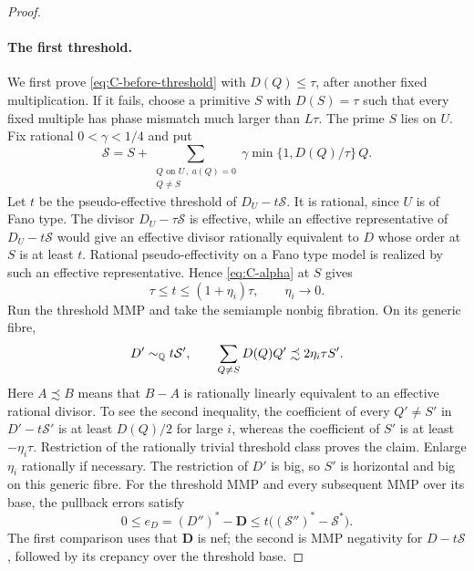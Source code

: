 \begin{proof}
\paragraph{The first threshold.}
We first prove \eqref{eq:C-before-threshold} with $D(Q)\leq\tau$,
after another fixed multiplication.  If it fails, choose a primitive
$S$ with $D(S)=\tau$ such that every fixed multiple has phase mismatch
much larger than $L\tau$.  The prime $S$ lies on $U$.  Fix rational
$0<\gamma<1/4$ and put
\begin{equation}\label{eq:C-threshold-divisor}
 \mathcal S=S+
 \sum_{\substack{Q\text{ on }U\,,\ a(Q)=0\\Q\ne S}}
                 \gamma\min\{1,D(Q)/\tau\}\,Q.
\end{equation}
Let $t$ be the pseudo-effective threshold of $D_U-t\mathcal S$.
It is rational, since $U$ is of Fano type.  The divisor
$D_U-\tau\mathcal S$ is effective, while an effective representative
of $D_U-t\mathcal S$ would give an effective divisor rationally
equivalent to $D$ whose order at $S$ is at least $t$.
Rational pseudo-effectivity on a Fano type model is realized by such
an effective representative.  Hence \eqref{eq:C-alpha} at $S$ gives
\begin{equation}\label{eq:C-threshold-location}
                    \tau\leq t\leq(1+\eta_i)\tau,
                           \qquad\eta_i\longrightarrow0.
\end{equation}
Run the threshold MMP and take the semiample nonbig fibration.  On its
generic fibre,
\begin{equation}\label{eq:C-threshold-comparison}
 D'\sim_\mathbb Q t\mathcal S',\qquad
 \sum_{Q\ne S}D(Q)Q'\precsim2\eta_i\tau S'.
\end{equation}
Here $A\precsim B$ means that $B-A$ is rationally linearly equivalent
to an effective rational divisor.  To see the second inequality, the
coefficient of every $Q'\ne S'$ in $D'-t\mathcal S'$ is at least
$D(Q)/2$ for large $i$, whereas the coefficient of $S'$ is at least
$-\eta_i\tau$.  Restriction of the rationally trivial threshold
class proves the claim.  Enlarge $\eta_i$ rationally if necessary.
The restriction of $D'$ is big, so $S'$ is horizontal and big on this
generic fibre.  For the threshold MMP and every subsequent MMP over
its base, the pullback errors satisfy
\begin{equation}\label{eq:C-threshold-error}
 0\leq e_D=(D'')^*-\mathbf D
       \leq t\bigl((\mathcal S'')^*-\mathcal S^*\bigr).
\end{equation}
The first comparison uses that $\mathbf D$ is nef; the second is
MMP negativity for $D-t\mathcal S$, followed by its crepancy over the
threshold base.


\end{proof}

